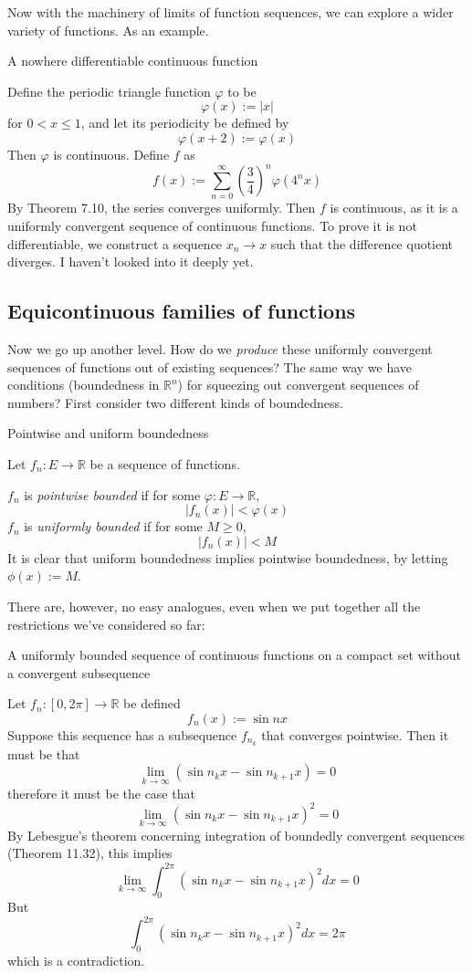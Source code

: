 Now with the machinery of limits of function sequences, we can explore a wider variety of functions. As an example.

\begin{example}A nowhere differentiable continuous function

    Define the periodic triangle function $\varphi$ to be
    \[\varphi(x) := |x|\]
    for $0 < x \leq 1$, and let its periodicity be defined by
    \[\varphi(x+2) := \varphi(x)\] 
    Then $\varphi$ is continuous. Define $f$ as
    \[f(x) := \sum_{n=0}^\infty \left(\frac{3}{4}\right)^n \varphi(4^nx)\]
    By Theorem 7.10, the series converges uniformly. Then $f$ is continuous, as it is a uniformly convergent sequence of continuous functions.
     To prove it is not differentiable, we construct a sequence $x_n \rightarrow x$ such that the difference quotient diverges. I haven't looked into it deeply yet.
 \end{example}

\subsection{Equicontinuous families of functions}

Now we go up another level. How do we \textit{produce} these uniformly convergent sequences of functions out of existing sequences? The same way we have conditions (boundedness in $\mathbb{R}^n$) for squeezing out convergent sequences of numbers? First consider two different kinds of boundedness.

\begin{definition} Pointwise and uniform boundedness
    
    Let $f_n: E \rightarrow \mathbb{R}$ be a sequence of functions.

    $f_n$ is \textit{pointwise bounded} if for some $\varphi: E \rightarrow \mathbb{R}$,
    \[|f_n(x)| < \varphi(x)\]
    $f_n$ is \textit{uniformly bounded} if for some $M \geq 0$,
    \[|f_n(x)| < M\]
    It is clear that uniform boundedness implies pointwise boundedness, by letting $\phi(x) := M$.
\end{definition}

There are, however, no easy analogues, even when we put together all the restrictions we've considered so far:

\begin{example} A uniformly bounded sequence of continuous functions on a compact set without a convergent subsequence

    Let $f_n: [0, 2\pi] \to \mathbb{R}$ be defined 
    \[f_n(x) := \sin nx\]
    Suppose this sequence has a subsequence $f_{n_k}$ that converges pointwise. Then it must be that
    \[\lim_{k \to \infty} (\sin n_k x - \sin n_{k+1}x) = 0\]
    therefore it must be the case that
    \[\lim_{k \to \infty} (\sin n_k x - \sin n_{k+1}x)^2 = 0\]
    By Lebesgue's theorem concerning integration of boundedly convergent sequences (Theorem 11.32), this implies
    \[\lim_{k \to \infty} \int_0^{2\pi} (\sin n_k x - \sin n_{k+1} x)^2 dx = 0\]
    But 
    \[\int_0^{2\pi} (\sin n_k x - \sin n_{k+1} x)^2 dx = 2\pi\]
    which is a contradiction.
\end{example}

